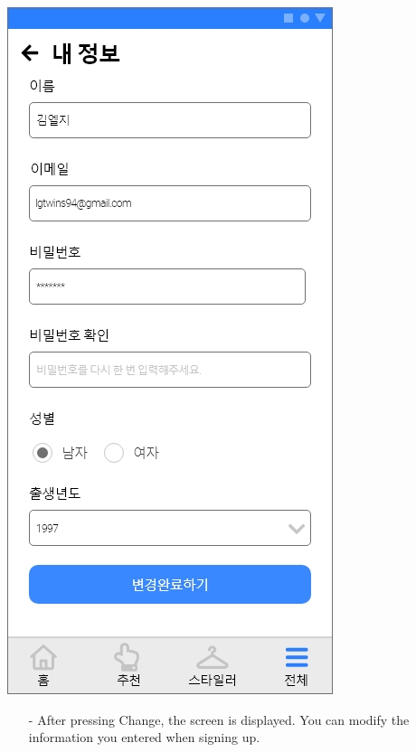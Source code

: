 \documentclass[conference]{IEEEtran}
\begin{document}
\begin{enumerate}
    \centerline{\includegraphics[scale=0.32]{assets/내 정보2.jpg}}
    \begin{itemize}
    \item[-] After pressing Change, the screen is displayed. You can modify the information you entered when signing up. \\ \\ \\
    \end{itemize}
    

\end{enumerate}
\end{document}

